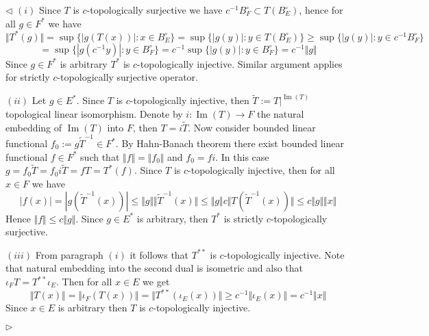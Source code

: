 \documentclass[12pt]{article}
\newenvironment{proof}{\par $\triangleleft$}{$\triangleright$}
\begin{document}
\begin{proof}
$(i)$ Since $T$ is $c$-topologically surjective we have $c^{-1}B_F^\circ\subset
T(B_E^\circ)$, hence for all $g\in F^*$ we have
$$
\Vert  T^*(g)\Vert
=\sup \{|g( T(x))|:x\in B_E^\circ \}
=\sup \{|g(y)|: y\in T(B_E^\circ) \}
\geq\sup \{|g(y)|: y\in c^{-1}B_F^\circ \}
$$
$$
=\sup \{|g(c^{-1}y)|: y\in B_F^\circ \}
=c^{-1}\sup \{|g(y)|: y\in B_F^\circ \}
=c^{-1}\Vert g\Vert
$$
Since $g\in F^*$ is arbitrary $ T^*$ is $c$-topologically injective. Similar
argument applies for strictly $c$-topologically surjective operator.

$(ii)$ Let $g\in E^*$. Since $ T$ is $c$-topologically injective, then 
$\tilde{ T}:=T|^{\operatorname{Im}( T)}$ topological linear isomorphism. 
Denote by $i:\operatorname{Im}( T)\to F$ the natural embedding 
of $\operatorname{Im}( T)$ into $F$, then $ T=i\tilde{ T}$. 
Now consider bounded linear functional
$f_0:=g\tilde{ T}^{-1}\in F^*$. By Hahn-Banach theorem there exist bounded
linear functional $f\in F^*$ such that $\Vert f\Vert=\Vert f_0\Vert$ and
$f_0=fi$. In this case $g=f_0\tilde{ T}=f_0 i\tilde{ T}=f T= T^*(f)$. Since $ T$
is $c$-topologically injective, then for all $x\in F$ we have
$$
|f(x)|=|g(\tilde{ T}^{-1}(x))|
\leq\Vert g\Vert\Vert \tilde{ T}^{-1}(x)\Vert
\leq\Vert g\Vert c\Vert  T(\tilde{ T}^{-1}(x))\Vert
\leq c\Vert g\Vert\Vert x\Vert
$$
Hence $\Vert f\Vert\leq c\Vert g\Vert$. Since $g\in E^*$ is arbitrary, then $
T^*$ is strictly $c$-topologically surjective.

$(iii)$ From paragraph $(i)$ it follows that $ T^{**}$ is $c$-topologically 
injective. Note that natural embedding into the second dual is isometric 
and also that $\iota_F  T = T^{**}\iota_E$. Then for all $x\in E$ we get
$$
\Vert T(x)\Vert
=\Vert \iota_F( T(x))\Vert
=\Vert T^{**}(\iota_E(x))\Vert
\geq c^{-1}\Vert \iota_E(x)\Vert
=c^{-1}\Vert x\Vert
$$
Since $x\in E$ is arbitrary then $ T$ is $c$-topologically injective.


\end{proof}
\end{document}
